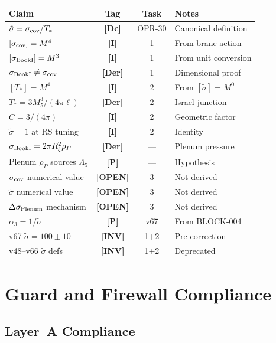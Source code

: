 \documentclass[11pt,a4paper]{article}
\newcommand{\tagDer}{\textcolor{derivedblue}{\textbf{[Der]}}}
\newcommand{\tagDc}{\textcolor{conditionalgreen}{\textbf{[Dc]}}}
\newcommand{\tagI}{\textcolor{mathpurple}{\textbf{[I]}}}
\newcommand{\tagP}{\textcolor{proposedred}{\textbf{[P]}}}
\newcommand{\tagOPEN}{\textcolor{openred}{\textbf{[OPEN]}}}
\newcommand{\tagINV}{\textcolor{invalidgray}{\textbf{[INV]}}}
\theoremstyle{definition}
\theoremstyle{remark}
\begin{document}
\begin{center}
\renewcommand{\arraystretch}{1.2}
\footnotesize
\begin{tabular}{p{5.5cm}ccp{3.5cm}}
\toprule
\textbf{Claim} & \textbf{Tag} & \textbf{Task} & \textbf{Notes} \\
\midrule
$\tilde\sigma = \sigma_{\rm cov}/T_*$ & \tagDc & OPR-30 & Canonical definition \\
$[\sigma_{\rm cov}] = M^4$ & \tagI & 1 & From brane action \\
$[\sigma_{\rm BookI}] = M^3$ & \tagI & 1 & From unit conversion \\
$\sigma_{\rm BookI} \neq \sigma_{\rm cov}$ & \tagDer & 1 & Dimensional proof \\
$[T_*] = M^4$ & \tagI & 2 & From $[\tilde\sigma] = M^0$ \\
$T_* = 3M_5^3/(4\pi\ell)$ & \tagDer & 2 & Israel junction \\
$C = 3/(4\pi)$ & \tagI & 2 & Geometric factor \\
$\tilde\sigma = 1$ at RS tuning & \tagI & 2 & Identity \\
$\sigma_{\rm BookI} = 2\pi R_\xi^2\rho_P$ & \tagDer & --- & Plenum pressure \\
Plenum $\rho_P$ sources $\Lambda_5$ & \tagP & --- & Hypothesis \\
$\sigma_{\rm cov}$ numerical value & \tagOPEN & 3 & Not derived \\
$\tilde\sigma$ numerical value & \tagOPEN & 3 & Not derived \\
$\Delta\sigma_{\rm Plenum}$ mechanism & \tagOPEN & 3 & Not derived \\
$\alpha_3 = 1/\tilde\sigma$ & \tagP & v67 & From BLOCK-004 \\
v67 $\tilde\sigma = 100 \pm 10$ & \tagINV & 1+2 & Pre-correction \\
v48--v66 $\tilde\sigma$ defs & \tagINV & 1+2 & Deprecated \\
\bottomrule
\end{tabular}
\end{center}

\section{Guard and Firewall Compliance}
\label{sec:firewall}

\subsection{Layer~A Compliance}
\end{document}
